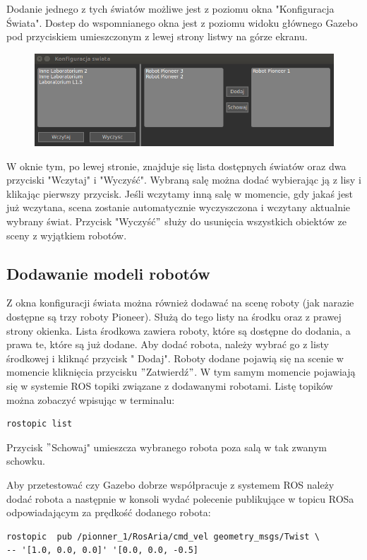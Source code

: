 \documentclass[10pt, a4paper]{article}
\begin{document}
Dodanie jednego z tych światów możliwe jest z poziomu okna "Konfiguracja Świata". Dostep do wspomnianego okna jest z poziomu widoku głównego Gazebo pod przyciskiem umieszczonym z lewej strony listwy na górze ekranu.
\begin{figure}[hbt]
  \setlength{\unitlength}{1.0cm}
  \centering 
  
    \includegraphics[width=12 cm]{./grafika/KOnfiguracjaSwiata.png}

\end{figure}
W oknie tym, po lewej stronie, znajduje się lista dostępnych światów oraz dwa przyciski "Wczytaj" i "Wyczyść". Wybraną salę można dodać wybierając ją z lisy i klikając pierwszy przycisk. Jeśli wczytamy inną salę w momencie, gdy jakaś jest już wczytana, scena zostanie automatycznie wyczyszczona i wczytany aktualnie wybrany świat. Przycisk "Wyczyść$"$ służy do usunięcia wszystkich obiektów ze sceny z wyjątkiem robotów.

 \subsection{Dodawanie modeli robotów}
Z okna konfiguracji świata można również dodawać na scenę roboty (jak narazie dostępne są trzy roboty Pioneer). Służą do tego listy na środku oraz z prawej strony okienka. Lista środkowa zawiera roboty, które są dostępne do dodania, a prawa te, które są już dodane. Aby dodać robota, należy wybrać go z listy środkowej i kliknąć przycisk " Dodaj". Roboty dodane pojawią się na scenie w momencie kliknięcia przycisku $"$Zatwierdź$"$.  W tym samym momencie pojawiają się w systemie ROS topiki związane z dodawanymi robotami. Listę topików można zobaczyć wpisując w terminalu:
\begin{verbatim}
rostopic list
\end{verbatim}
Przycisk $"$Schowaj" umieszcza wybranego robota poza salą w tak zwanym schowku.

Aby przetestować czy Gazebo dobrze współpracuje z systemem ROS należy dodać robota a następnie w konsoli wydać polecenie publikujące w topicu ROSa odpowiadającym za prędkość dodanego robota:
\begin{verbatim}
rostopic  pub /pionner_1/RosAria/cmd_vel geometry_msgs/Twist \
-- '[1.0, 0.0, 0.0]' '[0.0, 0.0, -0.5]
\end{verbatim}
\end{document}
